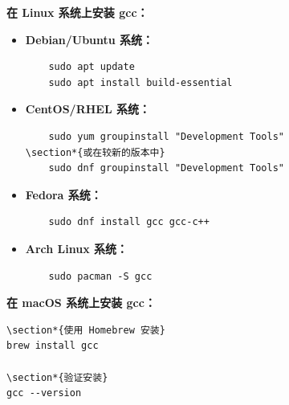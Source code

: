 \documentclass[12pt,UTF8]{ctexbook}
\begin{document}
\textbf{在 Linux 系统上安装 gcc：}
\begin{itemize}
    \item \textbf{Debian/Ubuntu 系统：}
    \begin{verbatim}
    sudo apt update
    sudo apt install build-essential
    \end{verbatim}
    \item \textbf{CentOS/RHEL 系统：}
    \begin{verbatim}
    sudo yum groupinstall "Development Tools"
\section*{或在较新的版本中}
    sudo dnf groupinstall "Development Tools"
    \end{verbatim}
    \item \textbf{Fedora 系统：}
    \begin{verbatim}
    sudo dnf install gcc gcc-c++
    \end{verbatim}
    \item \textbf{Arch Linux 系统：}
    \begin{verbatim}
    sudo pacman -S gcc
    \end{verbatim}
\end{itemize}

\textbf{在 macOS 系统上安装 gcc：}
\begin{verbatim}
\section*{使用 Homebrew 安装}
brew install gcc

\section*{验证安装}
gcc --version
\end{verbatim}
\end{document}
